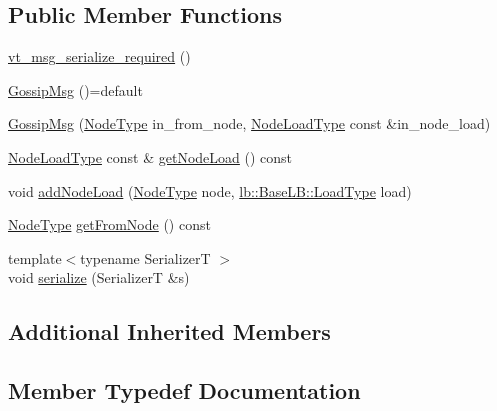 \subsection*{Public Member Functions}
\begin{DoxyCompactItemize}
\item 
\hyperlink{structvt_1_1vrt_1_1collection_1_1balance_1_1_gossip_msg_adf3c2f55e4349f8d5f497a0f88f047cf}{vt\+\_\+msg\+\_\+serialize\+\_\+required} ()
\item 
\hyperlink{structvt_1_1vrt_1_1collection_1_1balance_1_1_gossip_msg_ae5d9af18865ffcbf49139e587d6117b6}{Gossip\+Msg} ()=default
\item 
\hyperlink{structvt_1_1vrt_1_1collection_1_1balance_1_1_gossip_msg_a9ffebd54d8397a1e5efbd089524e53f2}{Gossip\+Msg} (\hyperlink{namespacevt_a866da9d0efc19c0a1ce79e9e492f47e2}{Node\+Type} in\+\_\+from\+\_\+node, \hyperlink{structvt_1_1vrt_1_1collection_1_1balance_1_1_gossip_msg_a8deef056cb137cfd67540a31be189122}{Node\+Load\+Type} const \&in\+\_\+node\+\_\+load)
\item 
\hyperlink{structvt_1_1vrt_1_1collection_1_1balance_1_1_gossip_msg_a8deef056cb137cfd67540a31be189122}{Node\+Load\+Type} const  \& \hyperlink{structvt_1_1vrt_1_1collection_1_1balance_1_1_gossip_msg_ad73dc00723416733adfc985a632d22e4}{get\+Node\+Load} () const
\item 
void \hyperlink{structvt_1_1vrt_1_1collection_1_1balance_1_1_gossip_msg_ad71cb026dce420d7c5e48d0fd87c2e61}{add\+Node\+Load} (\hyperlink{namespacevt_a866da9d0efc19c0a1ce79e9e492f47e2}{Node\+Type} node, \hyperlink{structvt_1_1vrt_1_1collection_1_1lb_1_1_base_l_b_a215e22b9f12678303f49615ae3be05cc}{lb\+::\+Base\+L\+B\+::\+Load\+Type} load)
\item 
\hyperlink{namespacevt_a866da9d0efc19c0a1ce79e9e492f47e2}{Node\+Type} \hyperlink{structvt_1_1vrt_1_1collection_1_1balance_1_1_gossip_msg_a025c5e1da0c0967bed68ba50666c92e5}{get\+From\+Node} () const
\item 
{\footnotesize template$<$typename SerializerT $>$ }\\void \hyperlink{structvt_1_1vrt_1_1collection_1_1balance_1_1_gossip_msg_a62aa6836c3898a1116fb20c0e03ba219}{serialize} (SerializerT \&s)
\end{DoxyCompactItemize}
\subsection*{Additional Inherited Members}


\subsection{Member Typedef Documentation}
\mbox{\label{structvt_1_1vrt_1_1collection_1_1balance_1_1_gossip_msg_a640e492438ba6fd6c8affa25ed0f17fc}} 
